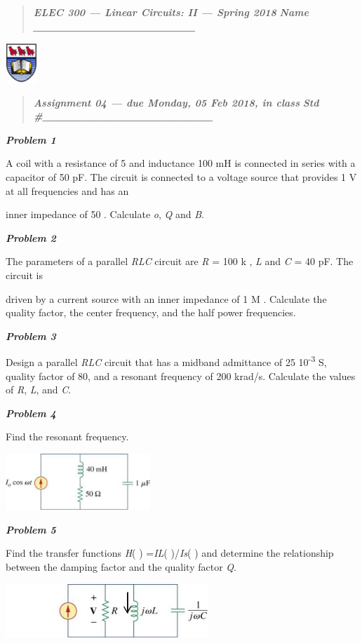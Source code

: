 \documentclass[lang=en]{skrapport}
\begin{document}
\begin{quote}
\emph{\textbf{ELEC 300 --- Linear Circuits: II --- Spring 2018}}
\emph{\textbf{Name \_\_\_\_\_\_\_\_\_\_\_\_\_\_\_\_\_\_\_}}
\end{quote}

\includegraphics[width=0.47222in,height=0.59236in]{media/image1.jpeg}

\begin{quote}
\emph{\textbf{Assignment 04 --- due Monday, 05 Feb 2018, in class}}
\emph{\textbf{Std \#\_\_\_\_\_\_\_\_\_\_\_\_\_\_\_\_\_\_\_\_}}
\end{quote}

\textbf{\emph{Problem 1}}

A coil with a resistance of 5 and inductance 100 mH is connected in
series with a capacitor of 50 pF. The circuit is connected to a voltage
source that provides 1 V at all frequencies and has an

inner impedance of 50 . Calculate \emph{o}, \emph{Q} and \emph{B}.

\textbf{\emph{Problem 2}}

The parameters of a parallel \emph{RLC} circuit are \emph{R} = 100 k ,
\emph{L} and \emph{C} = 40 pF. The circuit is

driven by a current source with an inner impedance of 1 M . Calculate
the quality factor, the center frequency, and the half power
frequencies.


\textbf{\emph{Problem 3}}

Design a parallel \emph{RLC} circuit that has a midband admittance of 25
10\textsuperscript{-3} S, quality factor of 80, and a resonant frequency
of 200 krad/s. Calculate the values of \emph{R}, \emph{L}, and \emph{C}.

\textbf{\emph{Problem 4}}

Find the resonant frequency.

\includegraphics[width=2.14167in,height=0.83611in]{media/image2.jpeg}

\textbf{\emph{Problem 5}}

Find the transfer functions \emph{H}( ) =\emph{IL}( )/\emph{Is}( ) and
determine the relationship between the damping factor and the quality
factor \emph{Q}.

\includegraphics[width=2.99792in,height=0.79514in]{media/image3.jpeg}
\end{document}
